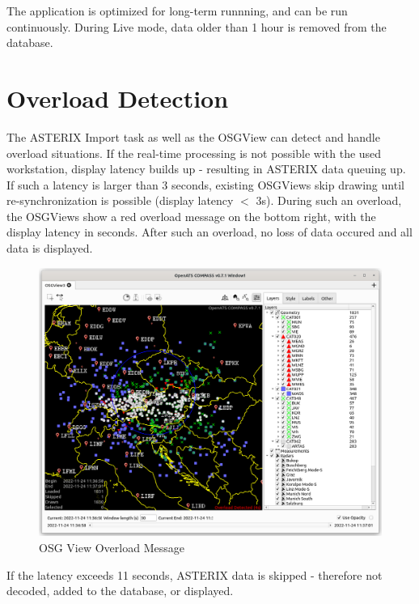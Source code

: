 The application is optimized for long-term runnning, and can be run continuously. During Live mode, data older than 1 hour is removed from the database. \\

\section{Overload Detection}

The ASTERIX Import task as well as the OSGView can detect and handle overload situations. If the real-time processing is not possible with the used workstation, display latency builds up - resulting in ASTERIX data queuing up. \\

If such a latency is larger than 3 seconds,  existing OSGViews skip drawing until re-synchronization is possible (display latency $<$ 3s). During such an overload, the OSGViews show a red overload message on the bottom right, with the display latency in seconds. After such an overload, no loss of data occured and all data is displayed. \\


\begin{figure}[H]
    \hspace*{-2.5cm}
    \includegraphics[width=19cm,frame]{figures/osgview_overload.png}
  \caption{OSG View Overload Message}
\end{figure} 

If the latency exceeds 11 seconds, ASTERIX data is skipped - therefore not decoded, added to the database, or displayed.







